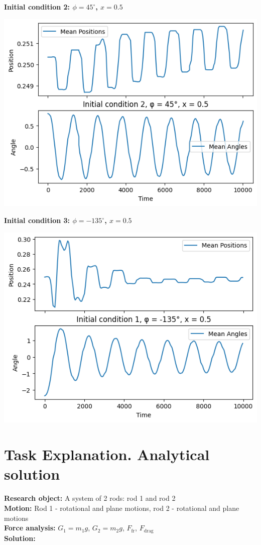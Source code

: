 \documentclass{article}
\begin{document}
\textbf{Initial condition 2: $\phi = 45^\circ$, $x = 0.5$}

\includegraphics*[scale=0.5]{graphics/init_2.png}

\textbf{Initial condition 3: $\phi = -135^\circ$, $x = 0.5$}

\includegraphics*[scale=0.5]{graphics/init_3.png}


\section{Task Explanation. Analytical solution}

\textbf{Research object:} A system of 2 rods: rod 1 and rod 2\\
\textbf{Motion:} Rod 1 - rotational and plane motions, rod 2 - rotational and plane motions\\
\textbf{Force analysis:} $G_1 = m_1 g$, $G_2 = m_2 g$, $F_\text{fr}$, $F_\text{drag}$\\
\textbf{Solution:}
\end{document}
